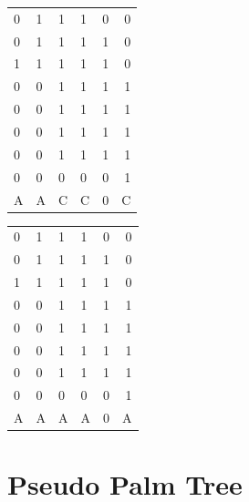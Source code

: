 	\begin{multicols}{2}

		\begin{tabular}{ l l |l l c r }
		  
		  0 & 1 & 1 & 1 & 0 & 0 \\
		  0 & 1 & 1 & 1 & 1 & 0 \\
		  1 & 1 & 1 & 1 & 1 & 0 \\
		  \hline
		  0 & 0 & 1 & 1 & 1 & 1 \\
		  0 & 0 & 1 & 1 & 1 & 1 \\
		  0 & 0 & 1 & 1 & 1 & 1 \\
		  0 & 0 & 1 & 1 & 1 & 1 \\
		  0 & 0 & 0 & 0 & 0 & 1 \\
		  \hline	
		  A & A & C & C & 0 & C \\
		
		\end{tabular}
	\columnbreak{|}
		\begin{tabular}{ l l | l l c r }
		  0 & 1 & 1 & 1 & 0 & 0 \\
		  0 & 1 & 1 & 1 & 1 & 0 \\
		  1 & 1 & 1 & 1 & 1 & 0 \\
		  \hline
		  0 & 0 & 1 & 1 & 1 & 1 \\
		  0 & 0 & 1 & 1 & 1 & 1 \\
		  0 & 0 & 1 & 1 & 1 & 1 \\
		  0 & 0 & 1 & 1 & 1 & 1 \\
		  0 & 0 & 0 & 0 & 0 & 1 \\
		  \hline
		  A & A & A & A & 0 & A\\

		\end{tabular}

	\end{multicols}

\newpage

\section{Pseudo Palm Tree}
	
